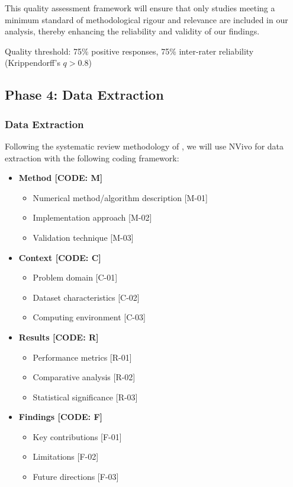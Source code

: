 \documentclass[acmsmall]{acmart}
\begin{document}
This quality assessment framework will ensure that only studies meeting a minimum standard of methodological rigour and relevance are included in our analysis, thereby enhancing the reliability and validity of our findings.

Quality threshold: 75\% positive responses, 75\% inter-rater reliability (Krippendorff's $q > 0.8$)

\subsection{Phase 4: Data Extraction}\label{subsec:phase-4-data-extraction}
\subsubsection{Data Extraction}\label{subsubsec:phase-4-data-extraction:data-extraction}
Following the systematic review methodology of \citet{kitchenham2007guidelines}, we will use NVivo for data extraction with the following coding framework:

\begin{itemize}
    \item \textbf{Method [CODE: M]}
          \begin{itemize}
              \item Numerical method/algorithm description [M-01]
              \item Implementation approach [M-02]
              \item Validation technique [M-03]
          \end{itemize}

    \item \textbf{Context [CODE: C]}
          \begin{itemize}
              \item Problem domain [C-01]
              \item Dataset characteristics [C-02]
              \item Computing environment [C-03]
          \end{itemize}

    \item \textbf{Results [CODE: R]}
          \begin{itemize}
              \item Performance metrics [R-01]
              \item Comparative analysis [R-02]
              \item Statistical significance [R-03]
          \end{itemize}

    \item \textbf{Findings [CODE: F]}
          \begin{itemize}
              \item Key contributions [F-01]
              \item Limitations [F-02]
              \item Future directions [F-03]
          \end{itemize}
\end{itemize}
\end{document}
